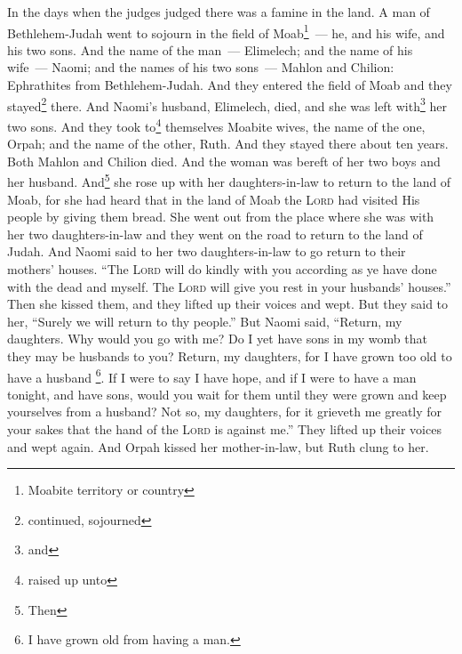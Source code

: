
\begin{inparaenum}
     In the days when the judges judged there was a famine in the land. A man of Bethlehem-Judah went to sojourn in the field of Moab\footnote{Moabite territory or country}~--- he, and his wife, and his two sons.%
     And the name of the man~--- Elimelech; and the name of his wife~--- Naomi; and the names of his two sons~--- Mahlon and Chilion: Ephrathites from Bethlehem-Judah. And they entered the field of Moab and they stayed\footnote{continued, sojourned} there.%
     And Naomi's husband, Elimelech, died, and she was left with\footnote{and} her two sons.%
     And they took to\footnote{raised up unto} themselves Moabite wives, the name of the one, Orpah; and the name of the other, Ruth. And they stayed there about ten years.%
     Both Mahlon and Chilion died. And the woman was bereft of her two boys and her husband.%
     And\footnote{Then} she rose up with her daughters-in-law to return to the land of Moab, for she had heard that in the land of Moab the \textsc{Lord} had visited His people by giving them bread.%
     She went out from the place where she was with her two daughters-in-law and they went on the road to return to the land of Judah.%
     And Naomi said to her two daughters-in-law to go return to their mothers' houses. ``The \textsc{Lord} will do kindly with you according as ye have done with the dead and myself.%
     The \textsc{Lord} will give you rest in your husbands' houses.'' Then she kissed them, and they lifted up their voices and wept.%
     But they said to her, ``Surely we will return to thy people.''%
     But Naomi said, ``Return, my daughters. Why would you go with me? Do I yet have sons in my womb that they may be husbands to you?%
     Return, my daughters, for I have grown too old to have a husband \footnote{I have grown old from having a man.}. If I were to say I have hope, and if I were to have a man tonight, and have sons,%
     would you wait for them until they were grown and keep yourselves from a husband? Not so, my daughters, for it grieveth me greatly for your sakes that the hand of the \textsc{Lord} is against me.''%
     They lifted up their voices and wept again. And Orpah kissed her mother-in-law, but Ruth clung to her.%

\end{inparaenum}
